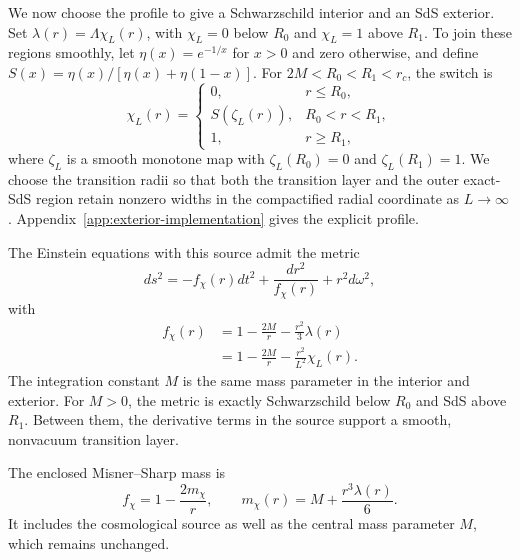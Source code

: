 \documentclass[
 aps,
 prd,
 reprint,
 superscriptaddress,
 nofootinbib,
 longbibliography
]{revtex4-2}
\begin{document}
We now choose the profile to give a Schwarzschild interior and an SdS
exterior.  Set
$\lambda(r)=\Lambda\chi_L(r)$, with $\chi_L=0$ below $R_0$ and $\chi_L=1$
above $R_1$.  To join these regions smoothly, let $\eta(x)=e^{-1/x}$ for
$x>0$ and zero otherwise, and define
$S(x)=\eta(x)/[\eta(x)+\eta(1-x)]$.  For $2M<R_0<R_1<r_c$, the switch is
\begin{equation}
 \chi_L(r)=
 \begin{cases}
 0,&r\leq R_0,\\[1mm]
 S\!\left(\zeta_L(r)\right),&R_0<r<R_1,\\[1mm]
 1,&r\geq R_1,
 \end{cases}
 \label{eq:exterior_switch}
\end{equation}
where $\zeta_L$ is a smooth monotone map with
$\zeta_L(R_0)=0$ and $\zeta_L(R_1)=1$.
We choose the transition radii so that both the transition layer and the
outer exact-SdS region retain nonzero
widths in the compactified radial coordinate as $L\to\infty$.
Appendix~\ref{app:exterior-implementation} gives the explicit profile.

The Einstein equations with this source admit the metric
\begin{equation}
 ds^2=-f_\chi(r)dt^2+\frac{dr^2}{f_\chi(r)}+r^2d\omega^2,
 \label{eq:exterior_metric}
\end{equation}
with
\begin{equation}
 \begin{aligned}
 f_\chi(r)&=1-\frac{2M}{r}-\frac{r^2}{3}\lambda(r)\\
 &=1-\frac{2M}{r}-\frac{r^2}{L^2}\chi_L(r).
 \end{aligned}
 \label{eq:exterior_f}
\end{equation}
The integration constant $M$ is the same mass parameter in the interior and
exterior.  For $M>0$, the metric is exactly Schwarzschild below $R_0$ and SdS
above $R_1$.  Between them, the derivative terms in the source support a
smooth, nonvacuum transition layer.

The enclosed Misner--Sharp mass is
\begin{equation}
 f_\chi=1-\frac{2m_\chi}{r},
 \qquad
 m_\chi(r)=M+\frac{r^3\lambda(r)}{6}.
 \label{eq:exterior_mass_function}
\end{equation}
It includes the cosmological source as well as the central mass parameter
$M$, which remains unchanged.
\end{document}
